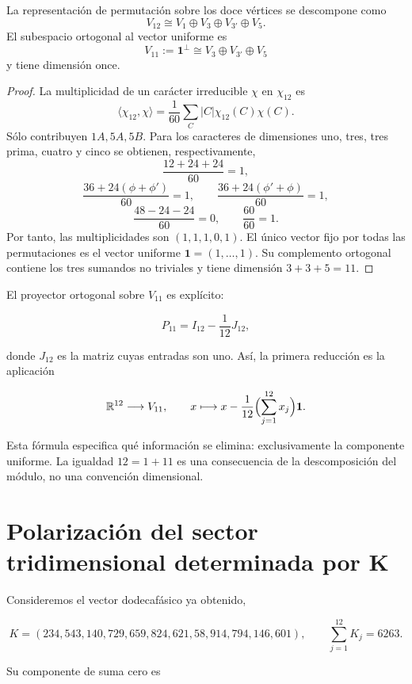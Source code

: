 \begin{theorem}
\label{thm:descomposicion-a5}
La representación de permutación sobre los doce vértices se descompone como
\[
V_{12}\cong V_1\oplus V_3\oplus V_{3'}\oplus V_5.
\]
El subespacio ortogonal al vector uniforme es
\[
V_{11}:=\mathbf1^\perp
\cong V_3\oplus V_{3'}\oplus V_5
\]
y tiene dimensión once.
\end{theorem}

\begin{proof}
La multiplicidad de un carácter irreducible \(\chi\) en \(\chi_{12}\) es
\[
\langle\chi_{12},\chi\rangle
=\frac1{60}\sum_C|C|\chi_{12}(C)\chi(C).
\]
Sólo contribuyen \(1A,5A,5B\). Para los caracteres de dimensiones uno, tres,
tres prima, cuatro y cinco se obtienen, respectivamente,
\[
\frac{12+24+24}{60}=1,
\]
\[
\frac{36+24(\phi+\phi')}{60}=1,
\qquad
\frac{36+24(\phi'+\phi)}{60}=1,
\]
\[
\frac{48-24-24}{60}=0,
\qquad
\frac{60}{60}=1.
\]
Por tanto, las multiplicidades son \((1,1,1,0,1)\). El único vector fijo por
todas las permutaciones es el vector uniforme
\(\mathbf1=(1,\ldots,1)\). Su complemento ortogonal contiene los tres
sumandos no triviales y tiene dimensión \(3+3+5=11\).
\end{proof}

El proyector ortogonal sobre \(V_{11}\) es explícito:

\[
P_{11}=I_{12}-\frac1{12}J_{12},
\]

donde \(J_{12}\) es la matriz cuyas entradas son uno. Así, la primera
reducción es la aplicación

\[
\mathbb R^{12}\longrightarrow V_{11},
\qquad
x\longmapsto x-\frac1{12}\Bigl(\sum_{j=1}^{12}x_j\Bigr)\mathbf1.
\]

Esta fórmula especifica qué información se elimina: exclusivamente la
componente uniforme. La igualdad \(12=1+11\) es una consecuencia de la
descomposición del módulo, no una convención dimensional.

\section[Polarización del sector tridimensional]{Polarización del sector tridimensional determinada por K}
\label{sec:reduccion-once-diez}

Consideremos el vector dodecafásico ya obtenido,

\[
K=(234,543,140,729,659,824,621,58,914,794,146,601),
\qquad
\sum_{j=1}^{12}K_j=6263.
\]

Su componente de suma cero es

